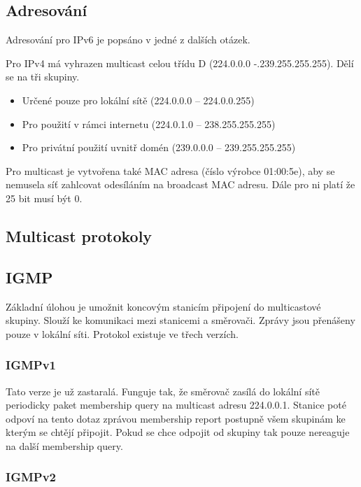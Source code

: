 \subsection{Adresování}

Adresování pro IPv6 je popsáno v jedné z dalších otázek.

Pro IPv4 má vyhrazen multicast celou třídu D (224.0.0.0 -.239.255.255.255).
Dělí se na tři skupiny.
\begin{itemize}[noitemsep]
    \item Určené pouze pro lokální sítě (224.0.0.0 -- 224.0.0.255)
    \item Pro použití v rámci internetu (224.0.1.0 -- 238.255.255.255)
    \item Pro privátní použití uvnitř domén (239.0.0.0 -- 239.255.255.255) 
\end{itemize}

Pro multicast je vytvořena také MAC adresa (číslo výrobce 01:00:5e), aby se nemusela síť zahlcovat odesíláním na broadcast MAC adresu.
Dále pro ni platí že 25 bit musí být 0.

\subsection{Multicast protokoly}

\subsection{IGMP}

Základní úlohou je umožnit koncovým stanicím připojení do multicastové skupiny.
Slouží ke komunikaci mezi stanicemi a směrovači.
Zprávy jsou přenášeny pouze v lokální síti.
Protokol existuje ve třech verzích.

\subsubsection{IGMPv1}

Tato verze je už zastaralá.
Funguje tak, že směrovač zasílá do lokální sítě periodicky paket membership query na multicast adresu 224.0.0.1.
Stanice poté odpoví na tento dotaz zprávou membership report postupně všem skupinám ke kterým se chtějí připojit.
Pokud se chce odpojit od skupiny tak pouze nereaguje na další membership query.

\subsubsection{IGMPv2}


